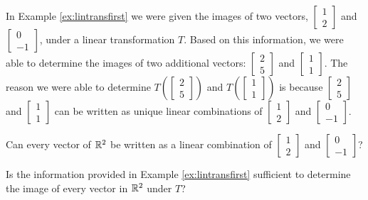 \documentclass{ximera}
\begin{document}
\begin{observation}
In Example \ref{ex:lintransfirst} we were given the images of two vectors, $\begin{bmatrix}1\\2\end{bmatrix}$ and $\begin{bmatrix}0\\-1\end{bmatrix}$, under a linear transformation $T$.  Based on this information, we were able to determine the images of two additional vectors: $\begin{bmatrix}2\\5\end{bmatrix}$ and $\begin{bmatrix}1\\1\end{bmatrix}$. 
The reason we were able to determine $T\left(\begin{bmatrix}2\\5\end{bmatrix}\right)$ and $T\left(\begin{bmatrix}1\\1\end{bmatrix}\right)$ is because $\begin{bmatrix}2\\5\end{bmatrix}$ and $\begin{bmatrix}1\\1\end{bmatrix}$ can be written as unique linear combinations of $\begin{bmatrix}1\\2\end{bmatrix}$ and $\begin{bmatrix}0\\-1\end{bmatrix}$.

Can every vector of $\mathbb{R}^2$ be written as a linear combination of $\begin{bmatrix}1\\2\end{bmatrix}$ and $\begin{bmatrix}0\\-1\end{bmatrix}$?
\begin{multipleChoice}
    \end{multipleChoice}
    
    Is the information provided in Example \ref{ex:lintransfirst} sufficient to determine the image of every vector in $\mathbb{R}^2$ under $T$?
    \begin{multipleChoice}
    \end{multipleChoice}
\end{observation}
\end{document}
